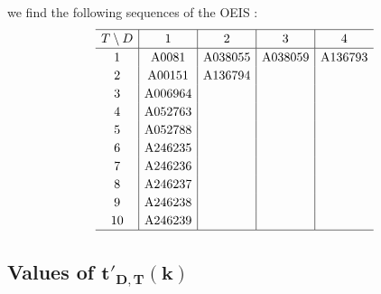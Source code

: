 \documentclass[pdftex]{sigma}
\numberwithin{equation}{section}
\begin{document}
we find the following sequences of the OEIS \cite{Sloane}:
\begin{gather*}
\setlength{\tabcolsep}{4.5pt}
\renewcommand{\arraystretch}{1.2}
\begin{tabular}{c|c|c|c|c}
\hline $T\setminus D$&1&2&3&4\\
\hline 1&A0081&A038055&A038059&A136793\\
2&A00151&A136794&\\
3&A006964&&\\
4&A052763&&\\
5&A052788&&\\
6&A246235&&\\
7&A246236&&\\
8&A246237&&\\
9&A246238&&\\
10&A246239&&\\
\hline
\end{tabular}\end{gather*}


\subsection[Values of t' D,T(k)]{Values of $\boldsymbol{t'_{D,T}(k)}$}
\end{document}
